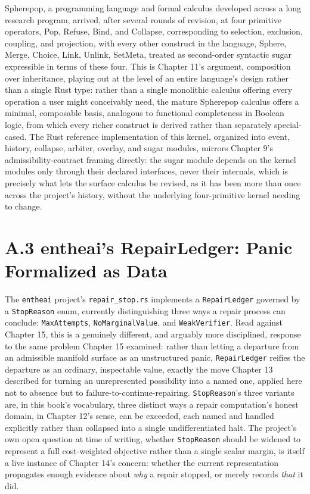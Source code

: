 \documentclass[11pt]{book}
\begin{document}
Spherepop, a programming language and formal calculus developed across a long research program, arrived, after several rounds of revision, at four primitive operators, Pop, Refuse, Bind, and Collapse, corresponding to selection, exclusion, coupling, and projection, with every other construct in the language, Sphere, Merge, Choice, Link, Unlink, SetMeta, treated as second-order syntactic sugar expressible in terms of these four. This is Chapter 11's argument, composition over inheritance, playing out at the level of an entire language's design rather than a single Rust type: rather than a single monolithic calculus offering every operation a user might conceivably need, the mature Spherepop calculus offers a minimal, composable basis, analogous to functional completeness in Boolean logic, from which every richer construct is derived rather than separately special-cased. The Rust reference implementation of this kernel, organized into event, history, collapse, arbiter, overlay, and sugar modules, mirrors Chapter 9's admissibility-contract framing directly: the sugar module depends on the kernel modules only through their declared interfaces, never their internals, which is precisely what lets the surface calculus be revised, as it has been more than once across the project's history, without the underlying four-primitive kernel needing to change.

\section*{A.3 entheai's RepairLedger: Panic Formalized as Data}

The \texttt{entheai} project's \texttt{repair\_stop.rs} implements a \texttt{RepairLedger} governed by a \texttt{StopReason} enum, currently distinguishing three ways a repair process can conclude: \texttt{MaxAttempts}, \texttt{NoMarginalValue}, and \texttt{WeakVerifier}. Read against Chapter 15, this is a genuinely different, and arguably more disciplined, response to the same problem Chapter 15 examined: rather than letting a departure from an admissible manifold surface as an unstructured panic, \texttt{RepairLedger} reifies the departure as an ordinary, inspectable value, exactly the move Chapter 13 described for turning an unrepresented possibility into a named one, applied here not to absence but to failure-to-continue-repairing. \texttt{StopReason}'s three variants are, in this book's vocabulary, three distinct ways a repair computation's honest domain, in Chapter 12's sense, can be exceeded, each named and handled explicitly rather than collapsed into a single undifferentiated halt. The project's own open question at time of writing, whether \texttt{StopReason} should be widened to represent a full cost-weighted objective rather than a single scalar margin, is itself a live instance of Chapter 14's concern: whether the current representation propagates enough evidence about \emph{why} a repair stopped, or merely records \emph{that} it did.
\end{document}
